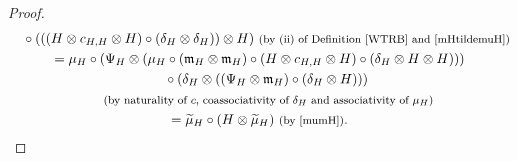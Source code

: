 \documentclass[pdftex]{sigma}
\numberwithin{equation}{section}
\begin{document}
\begin{proof}
\begin{gather*}
\quad{}\circ(((H\otimes c_{H,H}\otimes H)\circ(\delta_{H}\otimes\delta_{H}))\otimes H)\ \text{\footnotesize\textnormal{(by (ii) of Definition \ref{WTRB} and \eqref{mHtildemuH})}}\\
= \mu_{H}\circ (\Psi_{H}\otimes (\mu_{H}\circ(\mathfrak{m}_{H}\otimes \mathfrak{m}_{H})\circ(H\otimes c_{H,H}\otimes H)\circ(\delta_{H}\otimes H\otimes H)))\\
\quad{}\circ(\delta_{H}\otimes ((\Psi_{H}\otimes \mathfrak{m}_{H})\circ(\delta_{H}\otimes H)))\\
\quad{}\ \text{\footnotesize\textnormal{(by naturality of $c$, coassociativity of $\delta_{H}$ and associativity of $\mu_{H}$)}}\\
= \widetilde{\mu}_{H}\circ(H\otimes\widetilde{\mu}_{H})\ \text{\footnotesize\textnormal{(by \eqref{mumH})}}.
\end{gather*}


\end{proof}
\end{document}
